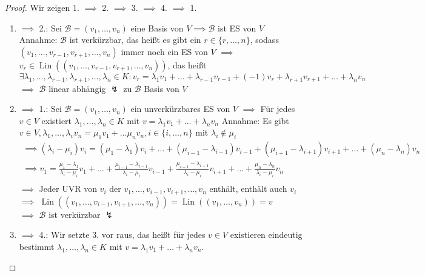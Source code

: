 \documentclass[a4paper]{scrartcl}
\DeclareMathOperator{\Exists}{\exists}
\DeclareMathOperator{\Lin}{Lin}
\theoremstyle{definition}
\theoremstyle{plain}
\theoremstyle{plain}
\theoremstyle{remark}
\theoremstyle{remark}
\theoremstyle{remark}
\theoremstyle{remark}
\theoremstyle{remark}
\begin{document}
\begin{proof}
Wir zeigen 1. $\implies$ 2. $\implies$ 3. $\implies$ 4. $\implies$ 1. \\
\begin{enumerate}
\item $\implies$ 2.: Sei $\mathcal{B} = (v_1, \ldots, v_n)$ eine Basis von $V \implies \mathcal{B}$ ist ES von $V$ \\
         Annahme: $\mathcal{B}$ ist verkürzbar, das heißt es gibt ein $r\in\{r, \ldots, n\}$, sodass $(v_1, \ldots, v_{r - 1}, v_{r + 1}, \ldots, v_n)$ immer noch ein ES von $V$
$\implies$ $v_r \in \Lin((v_1, \ldots, v_{r - 1}, v_{r + 1}, \ldots, v_n))$, das heißt
\[\Exists \lambda_1, \ldots, \lambda_{r - 1}, \lambda_{r + 1}, \ldots, \lambda_n\in K: v_r = \lambda_1 v_1 + \ldots + \lambda_{r - 1} v_{r - 1} + (-1)v_r + \lambda_{r + 1} v_{r + 1} + \ldots + \lambda_n v_n\]
$\implies$ $\mathcal{B}$ linear abhängig $\lightning$ zu $\mathcal{B}$ Basis von $V$
\item $\implies$ 1.: Sei $\mathcal{B} = (v_1, \ldots, v_n)$ ein unverkürzbares ES von $V$ $\implies$ Für jedes $v\in V$ existiert $\lambda_1, \ldots, \lambda_n \in K$ mit $v = \lambda_1 v_1 + \ldots + \lambda_n v_n$
         Annahme: Es gibt $v\in V, \lambda_1, \ldots, \lambda_v v_n = \mu_1 v_1 + \ldots \mu_n v_n, i \in \{i, \ldots, n\}$ mit $\lambda_i \not \in \mu_i$
\begin{align*}
\implies (\lambda_i - \mu_i) v_i = (\mu_1 - \lambda_1)v_i + \ldots + (\mu_{i - 1} - \lambda_{i - 1})v_{i - 1} + (\mu_{i + 1} - \lambda_{i + 1}) v_{i + 1} + \ldots + (\mu_n - \lambda_n) v_n \\
\implies v_1 = \frac{\mu_{1} - \lambda_{1}}{\lambda_{i} - \mu_{i}} v_1 + \ldots + \frac{\mu_{i - 1} - \lambda_{i - 1}}{\lambda_{i} - \mu_{i}} v_{i - 1} + \frac{\mu_{i + 1} - \lambda_{i + 1}}{\lambda_{i} - \mu_{i}} v_{i + 1} + \ldots + \frac{\mu_{n} - \lambda_{n}}{\lambda_{i} - \mu_{i}} v_n \\
\end{align*}
$\implies$ Jeder UVR von $v_i$ der $v_1, \ldots, v_{i - 1}, v_{i + 1}, \ldots, v_n$  enthält, enthält auch $v_i$ \\
         $\implies$ $\Lin((v_1, \ldots, v_{i - 1}, v_{i + 1}, \ldots, v_n)) = \Lin((v_1, \ldots, v_n)) = v$ \\
         $\implies$ $\mathcal{B}$ ist verkürzbar $\lightning$
\item $\implies$ 4.: Wir setzte 3. vor raus, das heißt für jedes $v\in V$ existieren eindeutig bestimmt $\lambda_1, \ldots, \lambda_n \in K$ mit $v = \lambda_1 v_1 + \ldots + \lambda_n v_n$. \\

\end{enumerate}
\end{proof}
\end{document}
